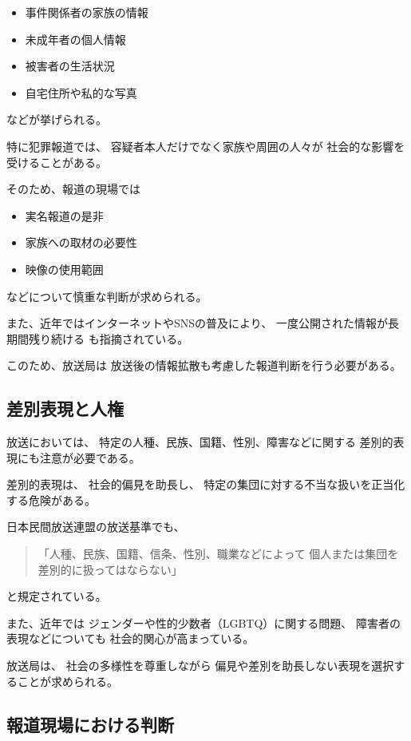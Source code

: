 \begin{itemize}
  \item 事件関係者の家族の情報
  \item 未成年者の個人情報
  \item 被害者の生活状況
  \item 自宅住所や私的な写真
\end{itemize}

などが挙げられる。

特に犯罪報道では、
容疑者本人だけでなく家族や周囲の人々が
社会的な影響を受けることがある。

そのため、報道の現場では

\begin{itemize}
  \item 実名報道の是非
  \item 家族への取材の必要性
  \item 映像の使用範囲
\end{itemize}

などについて慎重な判断が求められる。

また、近年ではインターネットやSNSの普及により、
一度公開された情報が長期間残り続ける
も指摘されている。

このため、放送局は
放送後の情報拡散も考慮した報道判断を行う必要がある。

\subsection{差別表現と人権}

放送においては、
特定の人種、民族、国籍、性別、障害などに関する
差別的表現にも注意が必要である。

差別的表現は、
社会的偏見を助長し、
特定の集団に対する不当な扱いを正当化する危険がある。

日本民間放送連盟の放送基準でも、

\begin{quote}
「人種、民族、国籍、信条、性別、職業などによって
個人または集団を差別的に扱ってはならない」
\end{quote}

と規定されている。

また、近年では
ジェンダーや性的少数者（LGBTQ）に関する問題、
障害者の表現などについても
社会的関心が高まっている。

放送局は、
社会の多様性を尊重しながら
偏見や差別を助長しない表現を選択することが求められる。

\subsection{報道現場における判断}

